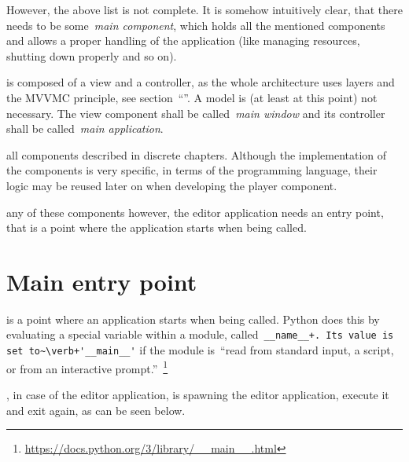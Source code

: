\documentclass[%
    a4paper,    %
    justified,  %
    nobib,      %
    openany     %
]{tufte-book}
\begin{document}
However, the above list is not complete. It is somehow intuitively clear, that
there needs to be some~\emph{main component}, which holds all the mentioned
components and allows a proper handling of the application (like managing
resources, shutting down properly and so on).

 is composed of a view and a controller, as the
whole architecture uses layers and the MVVMC principle, see
section~\enquote{}. A model is (at least at this point) not
necessary. The view component shall be called~\emph{main window} and its
controller shall be called~\emph{main application}.

 all components described in discrete chapters.
Although the implementation of the components is very specific, in terms of the
programming language, their logic may be reused later on when developing the
player component.

 any of these components however, the editor
application needs an entry point, that is a point where the application starts
when being called.

\section{Main entry point}
\label{appendix:sec:editor:main}

 is a point where an application starts when being
called. Python does this by evaluating a special variable within a module,
called~\verb=__name__+. Its value is set to~\verb+'__main__'= if the module
is~\enquote{read from standard input, a script, or from an interactive
prompt.}~\footnote{\url{https://docs.python.org/3/library/__main__.html}}

, in case of the editor
application, is spawning the editor application, execute it and exit again, as
can be seen below.
\end{document}
